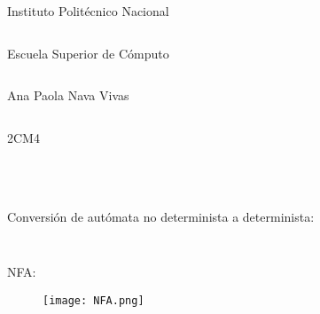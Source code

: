 \documentclass[addressstd,a4paper,10pt]{dinbrief}
\begin{document}
Instituto Polit\'ecnico Nacional
\begin{lstlisting}
\end{lstlisting}
Escuela Superior de C\'omputo
\begin{lstlisting}
\end{lstlisting}
Ana Paola Nava Vivas
\begin{lstlisting}
\end{lstlisting}
2CM4

\begin{lstlisting}
\end{lstlisting}
\begin{lstlisting}
\end{lstlisting}
\begin{lstlisting}
\end{lstlisting}
\begin{lstlisting}
\end{lstlisting}
Conversi\'on de aut\'omata no determinista a determinista:
\begin{lstlisting}
\end{lstlisting}
\begin{lstlisting}
\end{lstlisting}


NFA:



\begin{center}
\begin{figure}
\texttt{[image: NFA.png]} 
\centering
\end{figure}
\end{center}
\begin{lstlisting}
\end{lstlisting}
\begin{lstlisting}
\end{lstlisting}
\begin{lstlisting}
\end{lstlisting}
\begin{lstlisting}
\end{lstlisting}
\begin{lstlisting}
\end{lstlisting}
\begin{lstlisting}
\end{lstlisting}
\begin{lstlisting}
\end{lstlisting}
\begin{lstlisting}
\end{lstlisting}
\begin{lstlisting}
\end{lstlisting}
\begin{lstlisting}
\end{lstlisting}
\begin{lstlisting}
\end{lstlisting}
\begin{lstlisting}
\end{lstlisting}
\begin{lstlisting}
\end{lstlisting}
\end{document}
